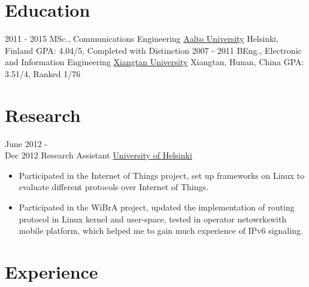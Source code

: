 \documentclass[letterpaper]{twentysecondcv} %
\begin{document}
\makeprofile %

\section{Education}

\begin{twenty} %
	\twentyitem
    	{2011 - 2015}
        {MSc., Communications Engineering}
        {\href{http://www.aalto.fi/en/}{Aalto University}}
        {Helsinki, Finland}
        {GPA: 4.04/5, Completed with Distinction}
	\twentyitem
    	{2007 - 2011}
        {BEng.,  Electronic and Information Engineering}
        {\href{http://www.xtu.edu.cn/english/}{Xiangtan University}}
        {Xiangtan, Hunan, China}
        {GPA: 3.51/4, Ranked 1/76}
\end{twenty}


\section{Research}
\begin{twenty}
	\twentyitem
    	{June 2012 - \\Dec 2012}
        {Research Assistant}
        {\href{https://www.helsinki.fi/en}{University of Helsinki}}
        {}
        {
        {\begin{itemize}
        \item Participated in the Internet of Things project, set up	 frameworks on Linux to evaluate different protocols over Internet of Things.
        \item Participated in the WiBrA project,	 updated	 the	 implementation of routing protocol in Linux kernel and	 user-space, tested in operator netowrkswith mobile platform, which helped me to gain much experience of IPv6 signaling.
    \end{itemize}}
        }
\end{twenty}


\section{Experience}
\end{document}
